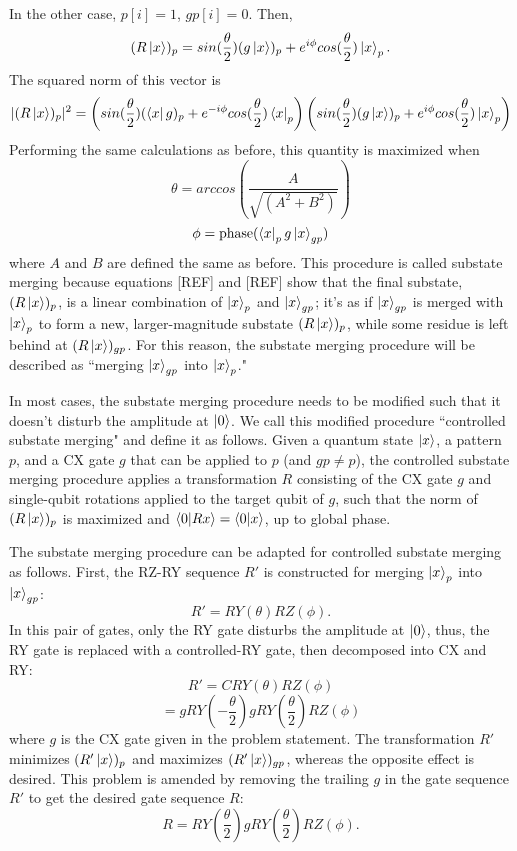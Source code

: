 \documentclass{article}
\begin{document}
In the other
case, $p[i] = 1$, $gp[i] = 0$. Then,
$$(R\mathinner{|{x}\rangle})_p = sin(\frac{\theta}{2})(g\mathinner{|{x}\rangle})_p + e^{i\phi}cos(\frac{\theta}{2})\mathinner{|{x}\rangle}_p.$$
The squared norm of this vector is
$$ |(R\mathinner{|{x}\rangle})_p|^2 = \left(sin(\frac{\theta}{2})(\mathinner{\langle{x}|}g)_p + e^{-i\phi}cos(\frac{\theta}{2})\mathinner{\langle{x}|}_p\right)\left(sin(\frac{\theta}{2})(g\mathinner{|{x}\rangle})_p + e^{i\phi}cos(\frac{\theta}{2})\mathinner{|{x}\rangle}_p\right)$$
Performing the same calculations as before, this quantity is maximized when
$$\theta = arccos(\frac{A}{\sqrt{(A^2 + B^2)}})$$
$$\phi = \text{phase}(\mathinner{\langle{x}|}_p g\mathinner{|{x}\rangle}_{gp})$$
where $A$ and $B$ are defined the same as before.
This procedure is called substate merging because equations [REF] and [REF] show
that the final substate, $(R\mathinner{|{x}\rangle})_p$, is a linear combination of $\mathinner{|{x}\rangle}_p$
and $\mathinner{|{x}\rangle}_{gp}$; it's as if $\mathinner{|{x}\rangle}_{gp}$ is merged with 
$\mathinner{|{x}\rangle}_p$ to form a new, larger-magnitude substate $(R\mathinner{|{x}\rangle})_p$, while some
residue is left behind at $(R\mathinner{|{x}\rangle})_{gp}$. For this
reason, the substate merging procedure will be described as ``merging
$\mathinner{|{x}\rangle}_{gp}$ into $\mathinner{|{x}\rangle}_p$." 

In most cases, the substate merging procedure needs to be modified such that it
doesn't disturb the amplitude at $\mathinner{|{0}\rangle}$. We call this modified procedure
``controlled substate merging" and define it as follows. Given a quantum state
$\mathinner{|{x}\rangle}$, a pattern $p$, and a CX gate $g$ that can be applied to $p$ (and 
$gp \neq p$), the
controlled substate merging procedure applies a transformation $R$ consisting
of the CX gate $g$ and single-qubit rotations applied to the target qubit of 
$g$, such that the norm of $(R\mathinner{|{x}\rangle})_p$ is maximized and 
$\mathinner{\langle{0|Rx}\rangle} = \mathinner{\langle{0|x}\rangle}$, up to global phase.

The substate merging procedure can be adapted for controlled substate merging as follows.
First, the
RZ-RY sequence $R'$ is constructed for merging $\mathinner{|{x}\rangle}_p$ into $\mathinner{|{x}\rangle}_{gp}$:
$$R' = RY(\theta)RZ(\phi).$$
In this pair of gates, only the RY gate disturbs
the amplitude at $\mathinner{|{0}\rangle}$, thus, the RY gate is replaced with a controlled-RY
gate, then decomposed into CX and RY:
$$R' = CRY(\theta)RZ(\phi)$$
$$= gRY(-\frac{\theta}{2})gRY(\frac{\theta}{2})RZ(\phi)$$
where $g$ is the CX gate given in the problem statement. The transformation $R'$
minimizes $(R'\mathinner{|{x}\rangle})_p$ and maximizes $(R'\mathinner{|{x}\rangle})_{gp}$, whereas the opposite
effect is desired.
This problem is amended by removing the trailing $g$ in the gate sequence $R'$
to get the desired gate sequence $R$:
$$R = RY(\frac{\theta}{2})gRY(\frac{\theta}{2})RZ(\phi).$$
\end{document}
